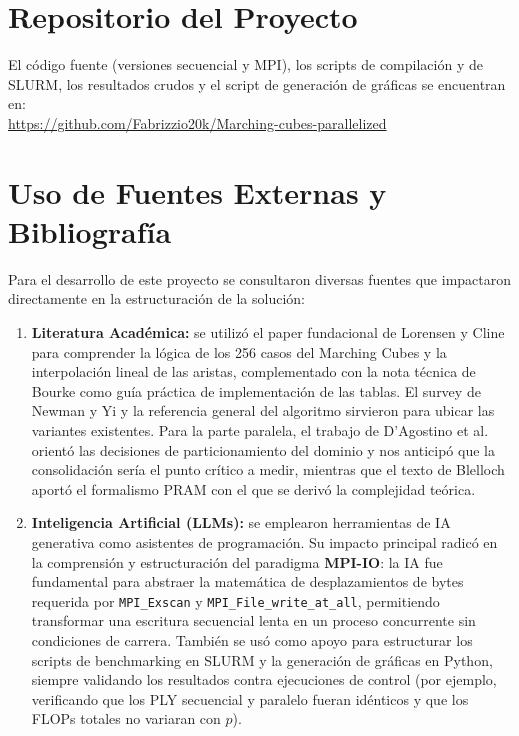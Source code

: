 \documentclass[conference]{IEEEtran}
\begin{document}
\section{Repositorio del Proyecto}
El código fuente (versiones secuencial y MPI), los scripts de compilación y de SLURM, los resultados crudos y el script de generación de gráficas se encuentran en: \\
\url{https://github.com/Fabrizzio20k/Marching-cubes-parallelized}

\section{Uso de Fuentes Externas y Bibliografía}

Para el desarrollo de este proyecto se consultaron diversas fuentes que impactaron directamente en la estructuración de la solución:

\begin{enumerate}
    \item \textbf{Literatura Académica:} se utilizó el paper fundacional de Lorensen y Cline \cite{b1} para comprender la lógica de los 256 casos del Marching Cubes y la interpolación lineal de las aristas, complementado con la nota técnica de Bourke \cite{b4} como guía práctica de implementación de las tablas. El survey de Newman y Yi \cite{b2} y la referencia general del algoritmo \cite{b3} sirvieron para ubicar las variantes existentes. Para la parte paralela, el trabajo de D'Agostino et al. \cite{b5} orientó las decisiones de particionamiento del dominio y nos anticipó que la consolidación sería el punto crítico a medir, mientras que el texto de Blelloch \cite{b6} aportó el formalismo PRAM con el que se derivó la complejidad teórica.
    \item \textbf{Inteligencia Artificial (LLMs):} se emplearon herramientas de IA generativa como asistentes de programación. Su impacto principal radicó en la comprensión y estructuración del paradigma \textbf{MPI-IO}: la IA fue fundamental para abstraer la matemática de desplazamientos de bytes requerida por \texttt{MPI\_Exscan} y \texttt{MPI\_File\_write\_at\_all}, permitiendo transformar una escritura secuencial lenta en un proceso concurrente sin condiciones de carrera. También se usó como apoyo para estructurar los scripts de benchmarking en SLURM y la generación de gráficas en Python, siempre validando los resultados contra ejecuciones de control (por ejemplo, verificando que los PLY secuencial y paralelo fueran idénticos y que los FLOPs totales no variaran con $p$).
\end{enumerate}
\end{document}
